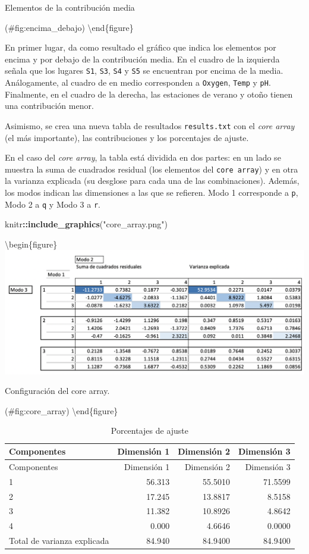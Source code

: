 \documentclass[
  spanish,
]{article}
\newenvironment{Shaded}{\begin{snugshade}}{\end{snugshade}}
\newcommand{\KeywordTok}[1]{\textcolor[rgb]{0.13,0.29,0.53}{\textbf{#1}}}
\newcommand{\NormalTok}[1]{#1}
\newcommand{\OperatorTok}[1]{\textcolor[rgb]{0.81,0.36,0.00}{\textbf{#1}}}
\newcommand{\StringTok}[1]{\textcolor[rgb]{0.31,0.60,0.02}{#1}}
\begin{document}
\caption{Elementos de la contribución media}

(\#fig:encima\_debajo)
\textbackslash end\{figure\}

En primer lugar, da como resultado el gráfico que indica los elementos por encima y por debajo de la contribución media. En el cuadro de la izquierda señala que los lugares \texttt{S1}, \texttt{S3}, \texttt{S4} y \texttt{S5} se encuentran por encima de la media. Análogamente, al cuadro de en medio corresponden a \texttt{Oxygen}, \texttt{Temp} y \texttt{pH}. Finalmente, en el cuadro de la derecha, las estaciones de verano y otoño tienen una contribución menor.

Asimismo, se crea una nueva tabla de resultados \texttt{results.txt} con el \emph{core array} (el más importante), las contribuciones y los porcentajes de ajuste.

En el caso del \emph{core array}, la tabla está dividida en dos partes: en un lado se muestra la suma de cuadrados residual (los elementos del \texttt{core\ array}) y en otra la varianza explicada (su desglose para cada una de las combinaciones). Además, los modos indican las dimensiones a las que se refieren. Modo 1 corresponde a \texttt{p}, Modo 2 a \texttt{q} y Modo 3 a \texttt{r}.

\begin{Shaded}
\begin{Highlighting}[]
\NormalTok{knitr}\OperatorTok{::}\KeywordTok{include\_graphics}\NormalTok{(}\StringTok{"core\_array.png"}\NormalTok{)}
\end{Highlighting}
\end{Shaded}

\textbackslash begin\{figure\}
\includegraphics[width=1\linewidth]{core_array}

\caption{Configuración del core array.}

(\#fig:core\_array)
\textbackslash end\{figure\}

\begin{longtable}[]{@{}lrrr@{}}
\caption{Porcentajes de ajuste}\tabularnewline
\toprule
Componentes & Dimensión 1 & Dimensión 2 & Dimensión 3\tabularnewline
\midrule
\endfirsthead
\toprule
Componentes & Dimensión 1 & Dimensión 2 & Dimensión 3\tabularnewline
\midrule
\endhead
1 & 56.313 & 55.5010 & 71.5599\tabularnewline
2 & 17.245 & 13.8817 & 8.5158\tabularnewline
3 & 11.382 & 10.8926 & 4.8642\tabularnewline
4 & 0.000 & 4.6646 & 0.0000\tabularnewline
Total de varianza explicada & 84.940 & 84.9400 & 84.9400\tabularnewline
\bottomrule
\end{longtable}
\end{document}
